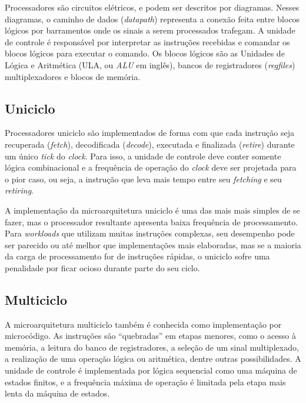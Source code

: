 { Processadores são circuitos elétricos, e podem ser descritos por diagramas.
    Nesses diagramas, o caminho de dados (\textit{datapath}) representa a
    conexão feita entre blocos lógicos por barramentos onde os sinais a serem
    processados trafegam. A unidade de controle é responsável por interpretar as
    instruções recebidas e comandar os blocos lógicos para executar o comando.
    Os blocos lógicos são as Unidades de Lógica e Aritmética (ULA, ou
    \textit{ALU} em inglês), bancos de registradores (\textit{regfiles})
    multiplexadores e blocos de memória.
}

    \subsection{Uniciclo}
    { Processadores uniciclo são implementados de forma com que cada instrução
        seja recuperada (\textit{fetch}), decodificada (\textit{decode}),
        executada e finalizada (\textit{retire}) durante um único \textit{tick}
        do \textit{clock}. Para isso, a unidade de controle deve conter somente
        lógica combinacional e a frequência de operação do \textit{clock} deve
        ser projetada para o pior caso, ou seja, a instrução que leva mais tempo
        entre seu \textit{fetching} e seu \textit{retiring}.
    }

    { A implementação da microarquitetura uniciclo é uma das mais mais simples
        de se fazer, mas o processador resultante apresenta baixa frequência de
        processamento. Para \textit{workloads} que utilizam muitas instruções
        complexas, seu desempenho pode ser parecido ou até melhor que implementações
        mais elaboradas, mas se a maioria da carga de processamento for de
        instruções rápidas, o uniciclo sofre uma penalidade por ficar ocioso
        durante parte do seu ciclo.
    }

    \subsection{Multiciclo}
    { A microarquitetura multiciclo também é conhecida como implementação por
        microcódigo. As instruções são ``quebradas'' em etapas menores, como
        o acesso à memória, a leitura do banco de registradores, a seleção de um
        sinal multiplexado, a realização de uma operação lógica ou aritmética,
        dentre outras possibilidades. A unidade de controle é implementada por
        lógica sequencial como uma máquina de estados finitos, e a frequência
        máxima de operação é limitada pela etapa mais lenta da máquina de estados.
    }

